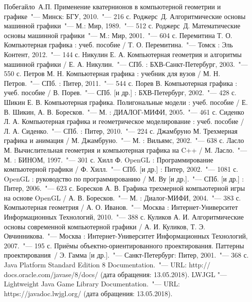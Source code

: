 \renewcommand{\bibname}{Список использованных источников}
\begin{thebibliography}{99}
 Побегайло~А.П. Применение кватернионов в компьютерной геометрии и графике~"--- Минск: БГУ,
2010.~"--- 216 с.
 Роджерс~Д. Алгоритмические основы машинной графики~"--- М.: Мир, 1989.~"--- 512 с.
 Роджерс~Д. Математические основы машинной графики~"--- М.: Мир, 2001.~"--- 604 с.
 Перемитина Т. О. Компьютерная графика : учеб. пособие / Т. О. Перемитина.~"--- Томск : Эль Контент, 2012.~"--- 144 с.
 Никулин Е. А. Компьютерная геометрия и алгоритмы машинной графики / Е. А. Никулин.~"--- СПб. : БХВ-Санкт-Петербург, 2003.~"--- 550 с.
 Петров М. Н. Компьютерная графика : учебник для вузов / М. Н. Петров.~"--- СПб. : Питер, 2011.~"--- 544 с.
 Порев В. Компьютерная графика : учеб. пособие / В. Порев.~"--- СПб. [и др.] : БХВ-Петербург, 2002.~"--- 428 с.
 Шикин Е. В. Компьютерная графика. Полигональные модели : учеб. пособие / Е. В. Шикин, А. В. Боресков.~"--- М. : ДИАЛОГ-МИФИ, 2005.~"--- 461 с.
 Сиденко Л. А. Компьютерная графика и геометрическое моделирование : учеб. пособие / Л. А. Сиденко.~"--- СПб. : Питер, 2010.~"--- 224 с.
 Джамбруно М. Трехмерная графика и анимация / М. Джамбруно.~"--- М. : Вильямс, 2002.~"--- 638 с.
 Ласло М. Вычислительная геометрия и компьютерная графика на C++ / М. Ласло.~"--- М. : БИНОМ, 1997.~"--- 301 с.
 Хилл Ф. OpenGL : Программирование компьютерной графики / Ф. Хилл.~"--- СПб. [и др.] : Питер, 2002.~"--- 1081 с.
 OpenGL : руководство по программированию / М. Ву [и др.].~"--- СПб. [и др.] : Питер, 2006.~"--- 623 с.
 Боресков А. В. Графика трехмерной компьютерной игры на основе OpenGL / А. В. Боресков.~"--- М. : Диалог-МИФИ, 2004.~"--- 383 с.
 Компьютерная геометрия / А. О. Иванов.~"--- Москва : Интернет-Университет Информационных Технологий, 2010.~"--- 388 с.
 Куликов А. И. Алгоритмические основы современной компьютерной графики / А. И. Куликов, Т. Э. Овчинникова.~"--- Москва : Интернет-Университет Информационных Технологий, 2007.~"--- 195 с.
 Приёмы объектно-ориентированного проектирования. Паттерны проектирования~/ Э. Гамма [и др.].~"---
Санкт-Петербург: Питер, 2001.~"--- 368 с.
 Java Platform Standard Edition 8 Documentation.~"--- URL: http:// docs.oracle.com/javase/8/docs/
(дата обращения: 13.05.2018).
 LWJGL "--- Lightweight Java Game Library Documentation.~"--- URL: https://javadoc.lwjgl.org/
(дата обращения: 13.05.2018).
\end{thebibliography}
